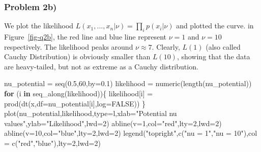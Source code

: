 \documentclass[
  letterpaper,
  DIV=11,
  numbers=noendperiod]{scrartcl}
\newenvironment{Shaded}{\begin{snugshade}}{\end{snugshade}}
\newcommand{\AttributeTok}[1]{\textcolor[rgb]{0.40,0.45,0.13}{#1}}
\newcommand{\ConstantTok}[1]{\textcolor[rgb]{0.56,0.35,0.01}{#1}}
\newcommand{\ControlFlowTok}[1]{\textcolor[rgb]{0.00,0.23,0.31}{\textbf{#1}}}
\newcommand{\DecValTok}[1]{\textcolor[rgb]{0.68,0.00,0.00}{#1}}
\newcommand{\FloatTok}[1]{\textcolor[rgb]{0.68,0.00,0.00}{#1}}
\newcommand{\FunctionTok}[1]{\textcolor[rgb]{0.28,0.35,0.67}{#1}}
\newcommand{\NormalTok}[1]{\textcolor[rgb]{0.00,0.23,0.31}{#1}}
\newcommand{\OtherTok}[1]{\textcolor[rgb]{0.00,0.23,0.31}{#1}}
\newcommand{\StringTok}[1]{\textcolor[rgb]{0.13,0.47,0.30}{#1}}
\begin{document}
\subsubsection{Problem 2b)}\label{problem-2b}

We plot the likelihood \(L(x_1,...,x_n|\nu)=\prod_ip(x_i|\nu)\) and
plotted the curve. in Figure~\ref{fig-q2b}, the red line and blue line
represent \(\nu = 1\) and \(\nu = 10\) respectively. The likelihood
peaks around \(\nu \approx 7\). Clearly, \(L(1)\) (also called Cauchy
Distribution) is obviously smaller than \(L(10)\), showing that the data
are heavy-tailed, but not as extreme as a Cauchy distribution.

\begin{Shaded}
\begin{Highlighting}[]
\NormalTok{nu\_potential }\OtherTok{=} \FunctionTok{seq}\NormalTok{(}\FloatTok{0.5}\NormalTok{,}\DecValTok{60}\NormalTok{,}\AttributeTok{by=}\FloatTok{0.1}\NormalTok{)}
\NormalTok{likelihood }\OtherTok{=} \FunctionTok{numeric}\NormalTok{(}\FunctionTok{length}\NormalTok{(nu\_potential))}
\ControlFlowTok{for}\NormalTok{ (i }\ControlFlowTok{in} \FunctionTok{seq\_along}\NormalTok{(likelihood))\{}
\NormalTok{  likelihood[i] }\OtherTok{=} \FunctionTok{prod}\NormalTok{(}\FunctionTok{dt}\NormalTok{(x,}\AttributeTok{df=}\NormalTok{nu\_potential[i],}\AttributeTok{log=}\ConstantTok{FALSE}\NormalTok{))}
\NormalTok{\}}
\FunctionTok{plot}\NormalTok{(nu\_potential,likelihood,}\AttributeTok{type=}\StringTok{\textquotesingle{}l\textquotesingle{}}\NormalTok{,}\AttributeTok{xlab=}\StringTok{"Potential nu values"}\NormalTok{,}\AttributeTok{ylab=}\StringTok{"Likelihood"}\NormalTok{,}\AttributeTok{lwd=}\DecValTok{2}\NormalTok{)}
\FunctionTok{abline}\NormalTok{(}\AttributeTok{v=}\DecValTok{1}\NormalTok{,}\AttributeTok{col=}\StringTok{"red"}\NormalTok{,}\AttributeTok{lty=}\DecValTok{2}\NormalTok{,}\AttributeTok{lwd=}\DecValTok{2}\NormalTok{)}
\FunctionTok{abline}\NormalTok{(}\AttributeTok{v=}\DecValTok{10}\NormalTok{,}\AttributeTok{col=}\StringTok{"blue"}\NormalTok{,}\AttributeTok{lty=}\DecValTok{2}\NormalTok{,}\AttributeTok{lwd=}\DecValTok{2}\NormalTok{)}
\FunctionTok{legend}\NormalTok{(}\StringTok{"topright"}\NormalTok{,}\FunctionTok{c}\NormalTok{(}\StringTok{"nu = 1"}\NormalTok{,}\StringTok{"nu = 10"}\NormalTok{),}\AttributeTok{col =} \FunctionTok{c}\NormalTok{(}\StringTok{"red"}\NormalTok{,}\StringTok{"blue"}\NormalTok{),}\AttributeTok{lty=}\DecValTok{2}\NormalTok{,}\AttributeTok{lwd=}\DecValTok{2}\NormalTok{)}
\end{Highlighting}
\end{Shaded}
\end{document}
